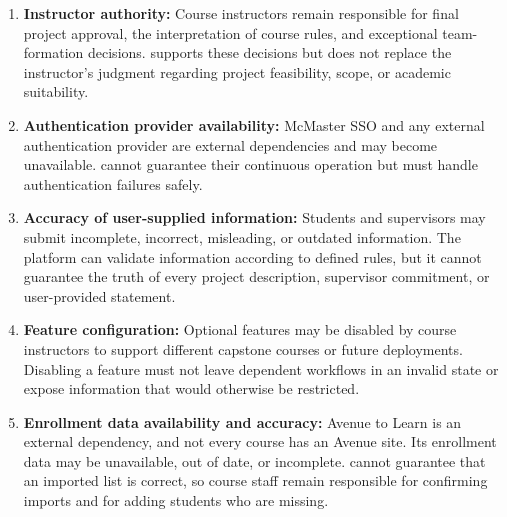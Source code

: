 \documentclass{article}
\begin{document}
\begin{enumerate}
    \item \textbf{Instructor authority:}
        Course instructors remain responsible for final project
        approval, the interpretation of course rules, and
        exceptional team-formation decisions. \projname{} supports
        these decisions but does not replace the instructor's
        judgment regarding project feasibility, scope, or
        academic suitability.
    \item \textbf{Authentication provider availability:}
        McMaster SSO and any external authentication provider
        are external dependencies and may become unavailable.
        \projname{} cannot guarantee their continuous operation
        but must handle authentication failures safely.
    \item \textbf{Accuracy of user-supplied information:}
        Students and supervisors may submit incomplete,
        incorrect, misleading, or outdated information.
        The platform can validate information according to
        defined rules, but it cannot guarantee the truth of
        every project description, supervisor commitment, or
        user-provided statement.
    \item \textbf{Feature configuration:}
        Optional features may be disabled by course instructors
        to support different capstone courses or future
        deployments. Disabling a feature must not leave
        dependent workflows in an invalid state or expose
        information that would otherwise be restricted.
    \item \textbf{Enrollment data availability and accuracy:}
        Avenue to Learn is an external dependency, and not every course has an Avenue site. Its enrollment data may be
        unavailable, out of date, or incomplete. \projname{} cannot guarantee that an imported list is correct, so course
        staff remain responsible for confirming imports and for adding students who are missing.
\end{enumerate}

\setlength{\tabcolsep}{4pt}
\newlength{\fw}
\setlength{\fw}{\dimexpr\textheight-14\tabcolsep-12pt\relax}
\end{document}

